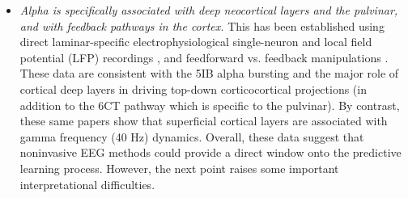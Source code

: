 \documentclass[11pt,twoside]{article}
\newif\myifpdf
\begin{document}
\begin{itemize}
	\item \emph{Alpha is specifically associated with deep neocortical layers and the pulvinar, and with feedback pathways in the cortex.}  This has been established using direct laminar-specific electrophysiological single-neuron and local field potential (LFP) recordings \citep{LuczakBarthoHarris13,BuffaloFriesLandmanEtAl11,MaierAdamsAuraEtAl10,MaierAuraLeopold11,SpaakBonnefondMaierEtAl12,XingYehBurnsEtAl12}, and feedforward vs. feedback manipulations \citep{vonSteinChiangKonig00,vanKerkoerleSelfDagninoEtAl14,BastosVezoliBosmanEtAl15,JensenBonnefondMarshallEtAl15,MichalareasVezolivanPeltEtAl16}.  	These data are consistent with the 5IB alpha bursting and the major role of cortical deep layers in driving top-down corticocortical projections (in addition to the 6CT pathway which is specific to the pulvinar).  By contrast, these same papers show that superficial cortical layers are associated with gamma frequency (40 Hz) dynamics.  Overall, these data suggest that noninvasive EEG methods could provide a direct window onto the predictive learning process.  However, the next point raises some important interpretational difficulties.

	

\end{itemize}
\end{document}
